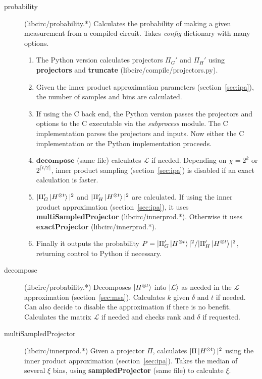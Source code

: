 \documentclass[11pt]{article}
\begin{document}
\begin{description}
    \item[probability] (libcirc/probability.*) Calculates the probability of making a given measurement from a compiled circuit. Takes \textit{config} dictionary with many options.
    \begin{enumerate}
        \setlength{\itemsep}{1pt}
        \item The Python version calculates projectors $\Pi_G'$ and $\Pi_H'$ using \textbf{projectors} and \textbf{truncate} (libcirc/compile/projectors.py).
        \item Given the inner product approximation parameters (section~\ref{sec:ipa}), the number of samples and bins are calculated.
        \item If using the C back end, the Python version passes the projectors and options to the C executable via the \textit{subprocess} module. The C implementation parses the projectors and inputs. Now either the C implementation or the Python implementation proceeds.
        \item $\textbf{decompose}$ (same file) calculates $\mathcal{L}$ if needed. Depending on $\chi = 2^k$ or $2^{\lceil t/2 \rceil}$, inner product sampling (section~\ref{sec:ipa}) is disabled if an exact calculation is faster.
            \item $|\Pi_G'\ket{H^{\otimes t}}|^2$ and $|\Pi_H'\ket{H^{\otimes t}}|^2$ are calculated. If using the inner product approximation (section~\ref{sec:ipa}), it uses \textbf{multiSampledProjector} (libcirc/innerprod.*). Otherwise it uses \textbf{exactProjector} (libcirc/innerprod.*).
        \item Finally it outputs the probability $P = |\Pi_G'\ket{H^{\otimes t}}|^2 / |\Pi_H'\ket{H^{\otimes t}}|^2$, returning control to Python if necessary.
    \end{enumerate}
    \item[decompose] (libcirc/probability.*) Decomposes $\ket{H^{\otimes t}}$ into $\ket{\mathcal{L}}$ as needed in the $\mathcal{L}$ approximation (section~\ref{sec:msa}). Calculates $k$ given $\delta$ and $t$ if needed. Can also decide to disable the approximation if there is no benefit. Calculates the matrix $\mathcal{L}$ if needed and checks rank and $\delta$ if requested.
    \item[multiSampledProjector] (libcirc/innerprod.*) Given a projector $\Pi$, calculates $|\Pi\ket{H^{\otimes t}}|^2$ using the inner product approximation (section~\ref{sec:ipa}). Takes the median of several $\xi$ bins, using \textbf{sampledProjector} (same file) to calculate $\xi$.

\end{description}
\end{document}
